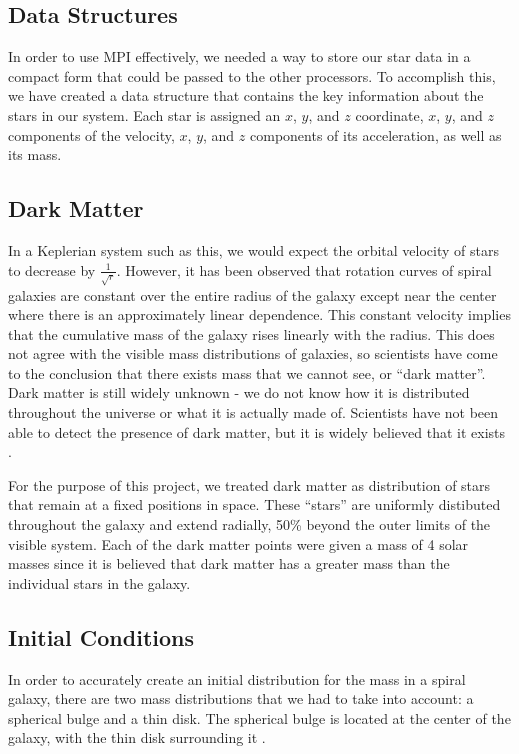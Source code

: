 \documentclass{article}
\begin{document}
\subsection{Data Structures}

In order to use MPI effectively, we needed a way to store our star data in a compact form that could be passed to the other processors.  To accomplish this, we have created a data structure that contains the key information about the stars in our system.  Each star is assigned an $x$, $y$, and $z$ coordinate, $x$, $y$, and $z$ components of the velocity, $x$, $y$, and $z$ components of its acceleration, as well as its mass.  

\subsection{Dark Matter}
\label{subsec:dark_matter_section}

In a Keplerian system such as this, we would expect the orbital velocity of stars to decrease by $\frac{1}{\sqrt{r}}$.  However, it has been observed that rotation curves of spiral galaxies are constant over the entire radius of the galaxy except near the center where there is an approximately linear dependence.  This constant velocity implies that the cumulative mass of the galaxy rises linearly with the radius.  This does not agree with the visible mass distributions of galaxies, so scientists have come to the conclusion that there exists mass that we cannot see, or ``dark matter''.  Dark matter is still widely unknown - we do not know how it is distributed throughout the universe or what it is actually made of.  Scientists have not been able to detect the presence of dark matter, but it is widely believed that it exists \cite{rotation-dynamics}.

For the purpose of this project, we treated dark matter as distribution of stars that remain at a fixed positions in space.  These ``stars'' are uniformly distibuted throughout the galaxy and extend radially, 50\% beyond the outer limits of the visible system.  Each of the dark matter points were given a mass of 4 solar masses since it is believed that dark matter has a greater mass than the individual stars in the galaxy.

\subsection{Initial Conditions}

In order to accurately create an initial distribution for the mass in a spiral galaxy, there are two mass distributions that we had to take into account: a spherical bulge and a thin disk.  The spherical bulge is located at the center of the galaxy, with the thin disk surrounding it \cite{rotation-dynamics}.  
\end{document}
